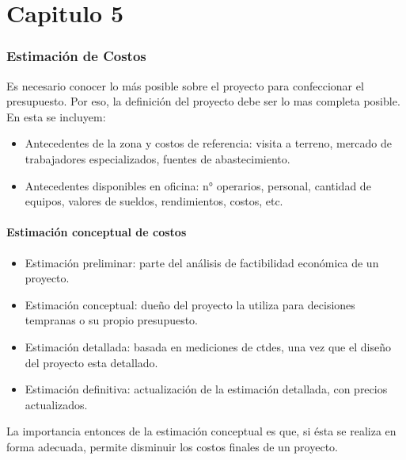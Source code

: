 \part{Capitulo 5}

\section{Estimación de Costos}

Es necesario conocer lo más posible sobre el proyecto para confeccionar el presupuesto. Por eso, la definición del proyecto debe ser lo mas completa posible. En esta se incluyem:

\begin{itemize}
    \item Antecedentes de la zona y costos de referencia: visita a terreno, mercado de trabajadores especializados, fuentes de abastecimiento.
    \item Antecedentes disponibles en oficina: n° operarios, personal, cantidad de equipos, valores de sueldos, rendimientos, costos, etc.
\end{itemize}

\subsection{Estimación conceptual de costos}

\begin{itemize}
    \item Estimación preliminar: parte del análisis de factibilidad económica de un proyecto.
    \item Estimación conceptual: dueño del proyecto la utiliza para decisiones tempranas o su propio presupuesto.
    \item Estimación detallada: basada en mediciones de ctdes, una vez que el diseño del proyecto esta detallado.
    \item Estimación definitiva: actualización de la estimación detallada, con precios actualizados.
\end{itemize}

La importancia entonces de la estimación conceptual es que, si ésta se realiza en forma adecuada, permite disminuir los costos finales de un proyecto.

